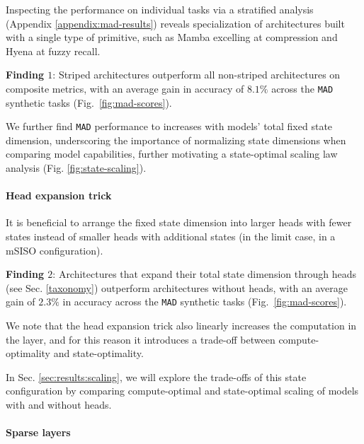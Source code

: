 Inspecting the performance on individual tasks via a stratified analysis (Appendix \ref{appendix:mad-results}) reveals specialization of architectures built with a single type of primitive, such as Mamba excelling at compression and Hyena at fuzzy recall.

\begin{tcolorbox}[enhanced, frame hidden, sharp corners, colback=blue!5, boxsep=0pt, before skip=0pt, after skip=0pt]
   \textbf{Finding $1$}: Striped architectures outperform all non-striped architectures on composite metrics, with an average gain in accuracy of $8.1\%$ across the {\tt MAD} synthetic tasks (Fig.~\ref{fig:mad-scores}). 
\end{tcolorbox}

We further find {\tt MAD} performance to increases with models' total fixed state dimension, underscoring the importance of normalizing state dimensions when comparing model capabilities, further motivating a state-optimal scaling law analysis (Fig. \ref{fig:state-scaling}). 

\paragraph{Head expansion trick} 

It is beneficial to arrange the fixed state dimension into larger heads with fewer states instead of smaller heads with additional states (in the limit case, in a mSISO configuration).

\begin{tcolorbox}[enhanced, frame hidden, sharp corners, colback=blue!5, boxsep=0pt, before skip=0pt, after skip=0pt]
   \textbf{Finding $2$}: Architectures that expand their total state dimension through heads (see Sec. \ref{taxonomy})
   outperform architectures without heads, with an average gain of $2.3\%$ in accuracy across the {\tt MAD} synthetic tasks (Fig.~\ref{fig:mad-scores}). 
\end{tcolorbox}

We note that the head expansion trick also linearly increases the computation in the layer, and for this reason it introduces a trade-off between compute-optimality and state-optimality.

In Sec. \ref{sec:results:scaling}, we will explore the trade-offs of this state configuration by comparing compute-optimal and state-optimal scaling of models with and without heads.

\paragraph{Sparse layers} 

